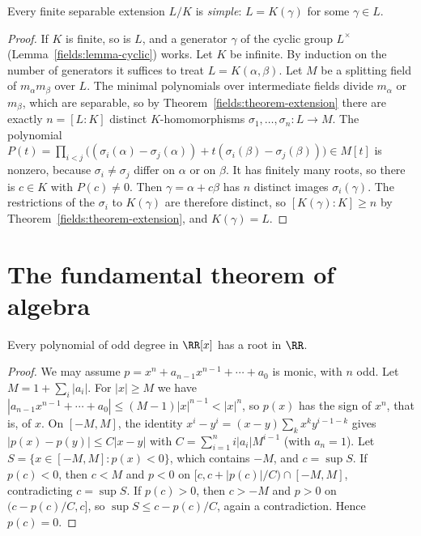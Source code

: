 \begin{theorem}\label{fields:theorem-primitive-element}
Every finite separable extension $L/K$ is \emph{simple}: $L = K(\gamma)$ for some $\gamma \in L$.
\end{theorem}

\begin{proof}
If $K$ is finite, so is $L$, and a generator $\gamma$ of the cyclic group $L^\times$
(Lemma~\ref{fields:lemma-cyclic}) works. Let $K$ be infinite. By induction on the number of
generators it suffices to treat $L = K(\alpha, \beta)$. Let $M$ be a splitting field of
$m_\alpha m_\beta$ over $L$. The minimal polynomials over intermediate fields divide $m_\alpha$ or
$m_\beta$, which are separable, so by Theorem~\ref{fields:theorem-extension} there are exactly
$n = [L : K]$ distinct $K$-homomorphisms $\sigma_1, \ldots, \sigma_n \colon L \to M$. The polynomial
$P(t) = \prod_{i < j}\bigl((\sigma_i(\alpha) - \sigma_j(\alpha)) + t(\sigma_i(\beta) - \sigma_j(\beta))\bigr) \in M[t]$ is
nonzero, because $\sigma_i \neq \sigma_j$ differ on $\alpha$ or on $\beta$. It has finitely many roots, so
there is $c \in K$ with $P(c) \neq 0$. Then $\gamma = \alpha + c\beta$ has $n$ distinct images
$\sigma_i(\gamma)$. The restrictions of the $\sigma_i$ to $K(\gamma)$ are therefore distinct, so
$[K(\gamma) : K] \geq n$ by Theorem~\ref{fields:theorem-extension}, and $K(\gamma) = L$.
\end{proof}

\section{The fundamental theorem of algebra}\label{fields:section-fta}

\begin{lemma}\label{fields:lemma-odd-degree}
Every polynomial of odd degree in $\RR[x]$ has a root in $\RR$.
\end{lemma}

\begin{proof}
We may assume $p = x^n + a_{n-1}x^{n-1} + \cdots + a_0$ is monic, with $n$ odd. Let
$M = 1 + \sum_i |a_i|$. For $|x| \geq M$ we have
$|a_{n-1}x^{n-1} + \cdots + a_0| \leq (M - 1)|x|^{n-1} < |x|^n$, so $p(x)$ has the sign of $x^n$, that is,
of $x$. On $[-M, M]$, the identity $x^i - y^i = (x - y)\sum_{k} x^k y^{i-1-k}$ gives
$|p(x) - p(y)| \leq C|x - y|$ with $C = \sum_{i=1}^n i|a_i| M^{i-1}$ (with $a_n = 1$). Let
$S = \{x \in [-M, M] : p(x) < 0\}$, which contains $-M$, and $c = \sup S$. If $p(c) < 0$, then
$c < M$ and $p < 0$ on $[c, c + |p(c)|/C) \cap [-M, M]$, contradicting $c = \sup S$. If $p(c) > 0$, then
$c > -M$ and $p > 0$ on $(c - p(c)/C, c]$, so $\sup S \leq c - p(c)/C$, again a contradiction. Hence
$p(c) = 0$.
\end{proof}

